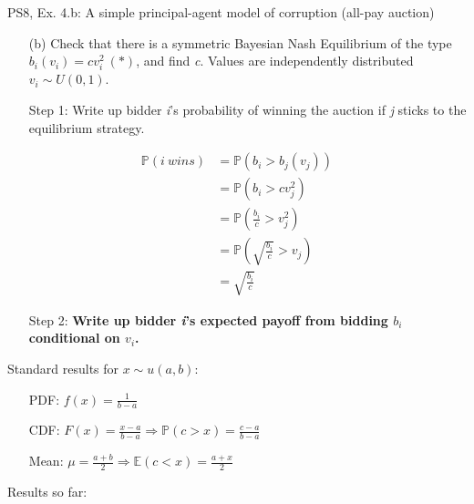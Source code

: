 \begin{frame}{PS8, Ex. 4.b: A simple principal-agent model of corruption (all-pay auction)}
    \begin{itemize}
      \item[(b)] Check that there is a symmetric Bayesian Nash Equilibrium of the type $b_i(v_i) = cv_i^2\ (*)$, and find \textit{c}. Values are independently distributed $v_i\sim U(0, 1)$.
    \end{itemize} \vspace{-8pt}
    \begin{multicols}{2}
      \begin{itemize}
        \item[Step 1:] Write up bidder \textit{i}'s probability of winning the auction if \textit{j} sticks to the equilibrium strategy.
      \end{itemize} \vspace{-8pt}
      \begin{align*}
        \mathbb{P}(i\ wins)&=\mathbb{P}(b_i>b_j(v_j))\\
                           &=\mathbb{P}(b_i>cv_j^2)\\
                           &=\mathbb{P}\left(\frac{b_i}{c}>v_j^2\right)\\
                           &=\mathbb{P}\left(\sqrt{\frac{b_i}{c}}>v_j\right)\\
                           &=\sqrt{\frac{b_i}{c}}
      \end{align*} \vspace{-8pt}
      \begin{itemize}
        \item[Step 2:] \textbf{Write up bidder \textit{i}'s expected payoff from bidding $b_i$ conditional on $v_i$.}
      \end{itemize}
      \vfill\null\columnbreak
      Standard results for $x\sim u(a, b):$ \vspace{-6pt}
      \begin{itemize}
        \item[PDF:] $f(x)=\frac{1}{b-a}$
        \item[CDF:] $F(x)=\frac{x-a}{b-a}\Rightarrow\mathbb{P}(c>x)=\frac{c-a}{b-a}$
        \item[Mean:] $\mu=\frac{a+b}{2}\Rightarrow\mathbb{E}(c<x)=\frac{a+x}{2}$
      \end{itemize}
      \vspace{-6pt}
      Results so far: \vspace{-6pt}
      \begin{align*}

\end{align*}
\end{multicols}
\end{frame}
